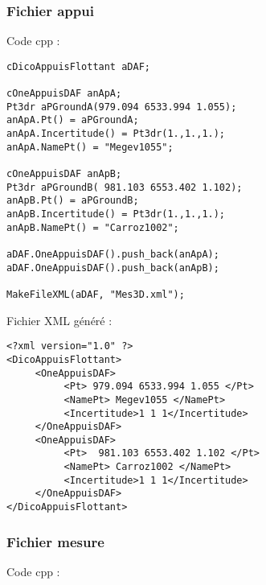 \documentclass{article}
\begin{document}
\subsubsection{Fichier appui}

Code cpp :

\begin{verbatim}
cDicoAppuisFlottant aDAF;

cOneAppuisDAF anApA;
Pt3dr aPGroundA(979.094 6533.994 1.055);
anApA.Pt() = aPGroundA;
anApA.Incertitude() = Pt3dr(1.,1.,1.);
anApA.NamePt() = "Megev1055";

cOneAppuisDAF anApB;
Pt3dr aPGroundB( 981.103 6553.402 1.102);
anApB.Pt() = aPGroundB;
anApB.Incertitude() = Pt3dr(1.,1.,1.);
anApB.NamePt() = "Carroz1002";

aDAF.OneAppuisDAF().push_back(anApA);
aDAF.OneAppuisDAF().push_back(anApB);

MakeFileXML(aDAF, "Mes3D.xml");

\end{verbatim}

Fichier XML généré :


\begin{verbatim}
<?xml version="1.0" ?>
<DicoAppuisFlottant>
     <OneAppuisDAF>
          <Pt> 979.094 6533.994 1.055 </Pt>
          <NamePt> Megev1055 </NamePt>
          <Incertitude>1 1 1</Incertitude>
     </OneAppuisDAF>
     <OneAppuisDAF>
          <Pt>  981.103 6553.402 1.102 </Pt>
          <NamePt> Carroz1002 </NamePt>
          <Incertitude>1 1 1</Incertitude>
     </OneAppuisDAF>
</DicoAppuisFlottant>
\end{verbatim}

\subsubsection{Fichier mesure}

Code cpp :
\end{document}
